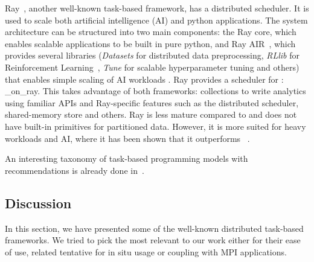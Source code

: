 Ray~\cite{222605_ray}, another well-known task-based framework, has a distributed scheduler.
It is used to scale both artificial intelligence (AI) and python applications. The system architecture can be structured into two main components: the Ray core, which enables scalable applications to be built in pure python, and Ray AIR~\cite{noauthor_ray_AIR_nodate}, which provides several libraries (\textit{Datasets} for distributed data preprocessing, \textit{RLlib} for Reinforcement Learning~\cite{liang2018rllib}, \textit{Tune} for scalable hyperparameter tuning\cite{liaw2018tune} and others) that enables simple scaling of AI workloads \cite{noauthor_ray_nodate}.   
Ray provides a scheduler for \dask: \dask\_on\_ray\cite{noauthor_using_nodate}. This takes advantage of both frameworks: \dask collections to write analytics using familiar APIs and Ray-specific features such as the distributed scheduler, shared-memory store and others.  
Ray is less mature compared to \dask and does not have built-in primitives for partitioned data. However, it is more suited for heavy workloads and AI, where it has been shown that it outperforms \dask~\cite{puurula_benchmarking_2019}.

An interesting taxonomy of task-based programming models with recommendations is already done in~\cite{gurhe2021}. 

\subsection{Discussion}\label{discussionTaskBased}
In this section, we have presented some of the well-known distributed task-based frameworks. We tried to pick the most relevant to our work either for their ease of use, related tentative for in situ usage or coupling with MPI applications. 

